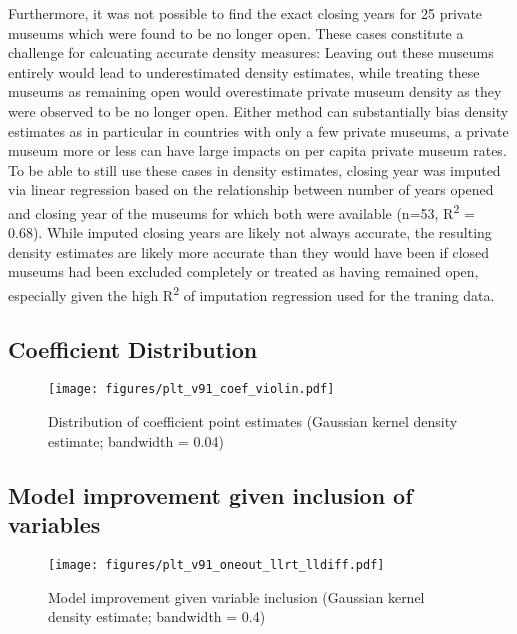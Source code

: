 \documentclass[11pt]{article}
\begin{document}
Furthermore, it was not possible to find the exact closing years for 25 private museums which were found to be no longer open.
These cases constitute a challenge for calcuating accurate density measures: 
Leaving out these museums entirely would lead to underestimated density estimates, while treating these museums as remaining open would overestimate private museum density as they were observed to be no longer open. 
Either method can substantially bias density estimates as in particular in countries with only a few private museums, a private museum more or less can have large impacts on per capita private museum rates.
To be able to still use these cases in density estimates, closing year was imputed via linear regression based on the relationship between number of years opened and closing year of the museums for which both were available (n=53, R\textsuperscript{2} = 0.68).
While imputed closing years are likely not always accurate, the resulting density estimates are likely more accurate than they would have been if closed museums had been excluded completely or treated as having remained open, especially given the high R\textsuperscript{2} of imputation regression used for the traning data.




\subsection{Coefficient Distribution}



\begin{figure}[htbp]
\centering
\texttt{[image: figures/plt\_v91\_coef\_violin.pdf]}
\caption{\label{fig:coef_violin}Distribution of coefficient point estimates (Gaussian kernel density estimate; bandwidth = 0.04)}
\end{figure}



\subsection{Model improvement given inclusion of variables}

\begin{figure}[htbp]
\centering
\texttt{[image: figures/plt\_v91\_oneout\_llrt\_lldiff.pdf]}
\caption{\label{fig:oneout_llrt_lldiff}Model improvement given variable inclusion (Gaussian kernel density estimate; bandwidth = 0.4)}
\end{figure}
\end{document}
